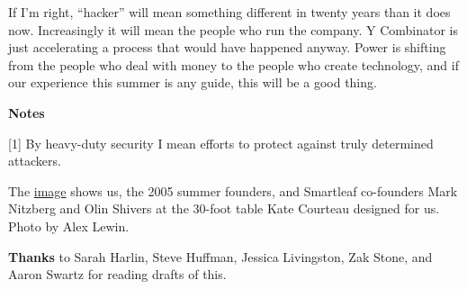If I'm right, ``hacker'' will mean something different in twenty years
than it does now. Increasingly it will mean the people who run the
company. Y Combinator is just accelerating a process that would have
happened anyway. Power is shifting from the people who deal with money
to the people who create technology, and if our experience this summer
is any guide, this will be a good thing.

\textbf{Notes}

{[}1{]} By heavy-duty security I mean efforts to protect against truly
determined attackers.

The
\href{https://sep.turbifycdn.com/ty/cdn/paulgraham/sfptable.jpg?t=1688221954&}{image}
shows us, the 2005 summer founders, and Smartleaf co-founders Mark
Nitzberg and Olin Shivers at the 30-foot table Kate Courteau designed
for us. Photo by Alex Lewin.

\textbf{Thanks} to Sarah Harlin, Steve Huffman, Jessica Livingston, Zak
Stone, and Aaron Swartz for reading drafts of this.
